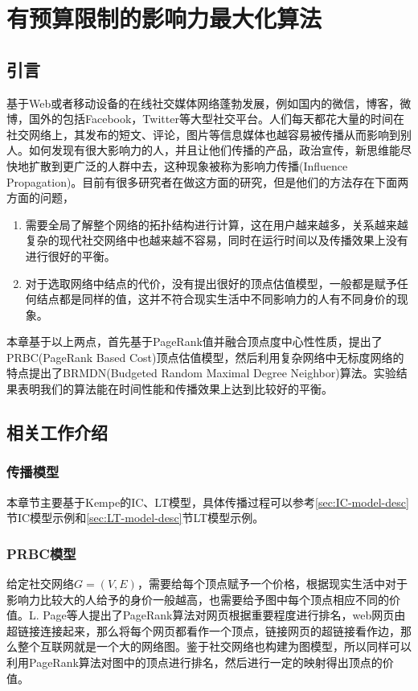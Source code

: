

\chapter{有预算限制的影响力最大化算法}
\label{cha:3thChap03}

\section{引言}
基于Web或者移动设备的在线社交媒体网络蓬勃发展，例如国内的微信，博客，微博，国外的包括Facebook，Twitter等大型社交平台。人们每天都花大量的时间在社交网络上，其发布的短文、评论，图片等信息媒体也越容易被传播从而影响到别人。如何发现有很大影响力的人，并且让他们传播的产品，政治宣传，新思维能尽快地扩散到更广泛的人群中去，这种现象被称为影响力传播(Influence Propagation)。目前有很多研究者在做这方面的研究，但是他们的方法存在下面两方面的问题，
\begin{enumerate}
\item 需要全局了解整个网络的拓扑结构进行计算，这在用户越来越多，关系越来越复杂的现代社交网络中也越来越不容易，同时在运行时间以及传播效果上没有进行很好的平衡。
\item 对于选取网络中结点的代价，没有提出很好的顶点估值模型，一般都是赋予任何结点都是同样的值，这并不符合现实生活中不同影响力的人有不同身价的现象。
\end{enumerate}
本章基于以上两点，首先基于PageRank值并融合顶点度中心性性质，提出了PRBC(PageRank Based Cost)顶点估值模型，然后利用复杂网络中无标度网络的特点提出了BRMDN(Budgeted Random Maximal Degree Neighbor)算法。实验结果表明我们的算法能在时间性能和传播效果上达到比较好的平衡。


\section{相关工作介绍}
\subsection{传播模型}
本章节主要基于Kempe\cite{kempe2003maximizing}的IC、LT模型，具体传播过程可以参考\ref{sec:IC-model-desc}节IC模型示例和\ref{sec:LT-model-desc}节LT模型示例。


\subsection{PRBC模型}
\label{sec:chap3:cost-model}
给定社交网络$G=(V, E)$，需要给每个顶点赋予一个价格，根据现实生活中对于影响力比较大的人给予的身价一般越高，也需要给予图中每个顶点相应不同的价值。L. Page\cite{page1999pagerank}等人提出了PageRank算法对网页根据重要程度进行排名，web网页由超链接连接起来，那么将每个网页都看作一个顶点，链接网页的超链接看作边，那么整个互联网就是一个大的网络图。鉴于社交网络也构建为图模型，所以同样可以利用PageRank算法对图中的顶点进行排名，然后进行一定的映射得出顶点的价值。


